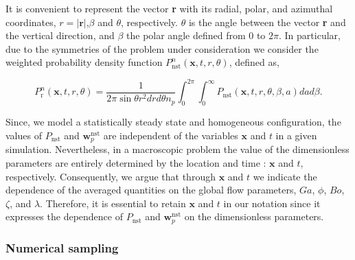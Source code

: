 It is convenient to represent the vector \textbf{r} with its radial, polar, and azimuthal coordinates,  $r = |\textbf{r}|$,$\beta$ and $\theta$, respectively. $\theta$ is the angle between the vector \textbf{r} and the vertical direction, and $\beta$ the polar angle defined from $0$ to $2\pi$. In particular, due to the symmetries of the problem under consideration we consider the weighted probability density function $P_\text{nst}^n(\textbf{x},t,r,\theta)$, defined as, 

\begin{equation}
    P_\text{r}^n(\textbf{x},t,r,\theta)
    =\frac{1}{2\pi \sin\theta r^2 dr d\theta n_p}
    \int_0^{2\pi}
    \int_0^\infty P_\text{nst}(\textbf{x},t,r,\theta,\beta,a) da d\beta.
\end{equation}


Since, we model a statistically steady state and homogeneous configuration, the values of $P_\text{nst}$ and $\textbf{w}^\text{nst}_p$ are independent of the variables $\mathbf{x}$ and $t$ in a given simulation. 
Nevertheless, in a macroscopic problem the value of the dimensionless parameters are entirely determined by the location and time : $\textbf{x}$ and $t$, respectively. 
Consequently, we argue that through $\mathbf{x}$ and $t$ we indicate the dependence of the averaged quantities on the global flow parameters, $Ga$, $\phi$, $Bo$, $\zeta$, and $\lambda$.
Therefore, it is essential to retain $\mathbf{x}$ and $t$ in our notation since it expresses the dependence of $P_\text{nst}$ and $\textbf{w}^\text{nst}_p$ on the dimensionless parameters. 



\subsubsection*{Numerical sampling}


